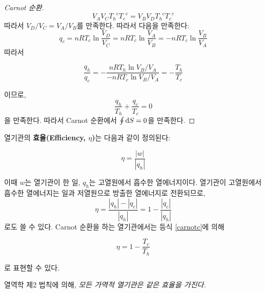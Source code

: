 \begin{proof}[Carnot 순환]
\begin{equation*}
            V_A V_C {T_h}^c {T_c}^c = V_B V_D {T_h}^c {T_c}^c
        \end{equation*}
        따라서 $\displaystyle V_D / V_C = V_A / V_B$를 만족한다. 따라서 다음을 만족한다:
        \begin{equation*}
            q_c = nRT_c \ln{\frac{V_D}{V_C}} = nRT_c \ln{\frac{V_A}{V_B}} = -nRT_c \ln{\frac{V_B}{V_A}}
        \end{equation*}
        따라서 
        \begin{obs}\label{carnotc}
        \begin{equation*}
            \frac{q_h}{q_c} = -\frac{nRT_h \ln{V_B / V_A}}{-nRT_c \ln{V_B / V_A}} = -\frac{T_h}{T_c}
        \end{equation*}
        \end{obs}
        이므로,
        \begin{equation*}
            \frac{q_h}{T_h} + \frac{q_c}{T_c} = 0
        \end{equation*}
        을 만족한다. 따라서 Carnot 순환에서 $\oint \operatorname{d\!} S = 0$을 만족한다. 
        \end{proof}
        \par 열기관의 \textbf{효율(Efficiency, $\eta$)}는 다음과 같이 정의된다:
        \begin{defn}[열기관의 효율]
        \begin{equation*}
            \eta = \frac{\left\vert w \right\vert}{\left\vert q_h \right\vert}
        \end{equation*}
        \end{defn}
        이때 $w$는 열기관이 한 일, $q_h$는 고열원에서 흡수한 열에너지이다. 열기관이 고열원에서 흡수한 열에너지는 일과 저열원으로 방출한 열에너지로 전환되므로, 
        \begin{equation*}
            \eta = \frac{\left\vert q_h \right\vert - \left\vert q_c \right\vert}{\left\vert q_h \right\vert} = 1 - \frac{\left\vert q_c \right\vert}{\left\vert q_h \right\vert}
        \end{equation*}
        로도 쓸 수 있다. Carnot 순환을 하는 열기관에서는 등식 \ref{carnotc}에 의해
        \begin{obs}
        \begin{equation*}
            \eta = 1 - \frac{T_c}{T_h}
        \end{equation*}
        \end{obs}
        로 표현할 수 있다.
        \par 열역학 제2 법칙에 의해, \textit{모든 가역적 열기관은 같은 효율을 가진다.} 
